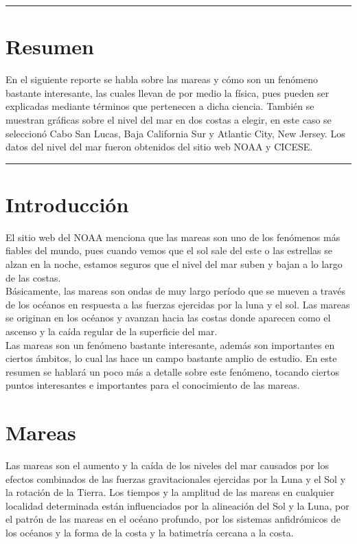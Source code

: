 \documentclass[12pt]{article}
\begin{document}
\begin{doublespace}
\hrule
\section*{Resumen}
En el siguiente reporte se habla sobre las mareas y cómo son un fenómeno bastante interesante, las cuales llevan de por medio la física, pues pueden ser explicadas mediante términos que pertenecen a dicha ciencia. También se muestran gráficas sobre el nivel del mar en dos costas a elegir, en este caso se seleccionó Cabo San Lucas, Baja California Sur y Atlantic City, New Jersey. Los datos del nivel del mar fueron obtenidos del sitio web NOAA y CICESE.
\vspace{0.6 cm}
\hrule

\vspace{0.6 cm}

\section*{Introducción}

El sitio web del NOAA menciona que las mareas son uno de los fenómenos más fiables del mundo, pues cuando vemos que el sol sale del este o las estrellas se alzan en la noche, estamos seguros que el nivel del mar suben y bajan a lo largo de las costas.\\ 

Básicamente, las mareas son ondas de muy largo período que se mueven a través de los océanos en respuesta a las fuerzas ejercidas por la luna y el sol. Las mareas se originan en los océanos y avanzan hacia las costas donde aparecen como el ascenso y la caída regular de la superficie del mar.\\ 

Las mareas son un fenómeno bastante interesante, además son importantes en ciertos ámbitos, lo cual las hace un campo bastante amplio de estudio. En este resumen se hablará un poco más a detalle sobre este fenómeno, tocando ciertos puntos interesantes e importantes para el conocimiento de las mareas. 

\section*{Mareas}

Las mareas son el aumento y la caída de los niveles del mar causados por los efectos combinados de las fuerzas gravitacionales ejercidas por la Luna y el Sol y la rotación de la Tierra. Los tiempos y la amplitud de las mareas en cualquier localidad determinada están influenciados por la alineación del Sol y la Luna, por el patrón de las mareas en el océano profundo, por los sistemas anfidrómicos de los océanos y la forma de la costa y la batimetría cercana a la costa.\\


\end{doublespace}
\end{document}

